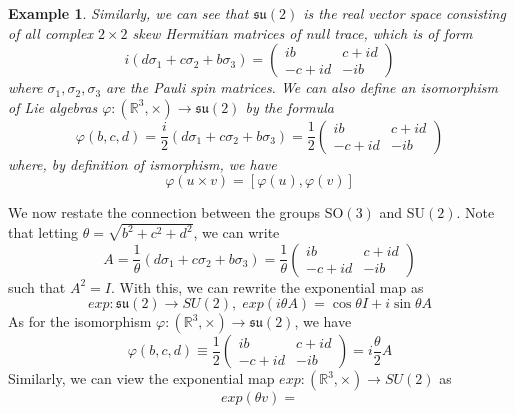 \documentclass{article}
\newtheorem{example}{Example}[section]
\theoremstyle{remark}
\theoremstyle{definition}
\begin{document}
\begin{example}
Similarly, we can see that $\mathfrak{su}(2)$ is the real vector space consisting of all complex $2 \times 2$ skew Hermitian matrices of null trace, which is of form
\[i(d \sigma_1 + c \sigma_2 + b \sigma_3) = \begin{pmatrix}
i b & c + i d\\
-c + i d & - i b
\end{pmatrix}\]
where $\sigma_1, \sigma_2, \sigma_3$ are the Pauli spin matrices. We can also define an isomorphism of Lie algebras $\varphi: (\mathbb{R}^3, \times) \longrightarrow \mathfrak{su}(2)$ by the formula
\[\varphi(b, c, d) = \frac{i}{2} (d \sigma_1 + c \sigma_2 + b \sigma_3) = \frac{1}{2} \begin{pmatrix}
i b & c + i d\\
-c + i d & - i b
\end{pmatrix}\]
where, by definition of ismorphism, we have
\[\varphi(u \times v) = [\varphi(u), \varphi(v)]\]
\end{example}

We now restate the connection between the groups SO$(3)$ and SU$(2)$. Note that letting $\theta = \sqrt{b^2 + c^2 + d^2}$, we can write 
\[A = \frac{1}{\theta} (d \sigma_1 + c \sigma_2 + b \sigma_3) = \frac{1}{\theta} \begin{pmatrix}
i b & c + i d\\
-c + i d & - i b
\end{pmatrix}\]
such that $A^2 = I$. With this, we can rewrite the exponential map as 
\[exp: \mathfrak{su}(2) \longrightarrow SU(2), \; exp(i \theta A) = \cos{\theta} I  + i \sin{\theta} A\]
As for the isomorphism $\varphi: (\mathbb{R}^3, \times) \longrightarrow \mathfrak{su}(2)$, we have
\[\varphi(b, c, d) \equiv \frac{1}{2} \begin{pmatrix}
i b & c + i d\\
-c + i d & - i b
\end{pmatrix} = i \frac{\theta}{2} A\]
Similarly, we can view the exponential map $exp: (\mathbb{R}^3, \times) \longrightarrow SU(2)$ as 
\[exp(\theta v) = \]
\end{document}
